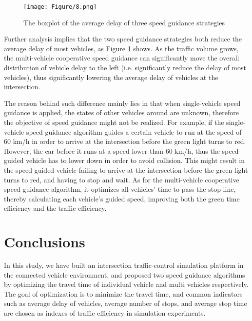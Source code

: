 \documentclass[10.5pt,compsoc]{TsT}
\theoremstyle{mystyle}
\begin{document}
{\begin{figure}
\centering
\texttt{[image: Figure/8.png]}
\caption{The boxplot of the average delay of three speed guidance
strategies}
\label{Figure 8} 
\end{figure}

Further analysis implies that the two speed guidance strategies both
reduce the average delay of most vehicles, as Figure \ref{Figure 8} shows. As the
traffic volume grows, the multi-vehicle cooperative speed guidance can
significantly move the overall distribution of vehicle delay to the left
(i.e. significantly reduce the delay of most vehicles), thus
significantly lowering the average delay of vehicles at the
intersection.

The reason behind such difference mainly lies in that when
single-vehicle speed guidance is applied, the states of other vehicles
around are unknown, therefore the objective of speed guidance might not
be realized. For example, if the single-vehicle speed guidance algorithm
guides a certain vehicle to run at the speed of 60 km/h in order to
arrive at the intersection before the green light turns to red. However,
the car before it runs at a speed lower than 60 km/h, thus the
speed-guided vehicle has to lower down in order to avoid collision. This
might result in the speed-guided vehicle failing to arrive at the
intersection before the green light turns to red, and having to stop and
wait. As for the multi-vehicle cooperative speed guidance algorithm, it
optimizes all vehicles' time to pass the stop-line, thereby calculating
each vehicle's guided speed, improving both the green time efficiency
and the traffic efficiency.

\section{Conclusions}
\noindent
In this study, we have built an intersection traffic-control simulation
platform in the connected vehicle environment, and proposed two speed
guidance algorithms by optimizing the travel time of individual vehicle
and multi vehicles respectively. The goal of optimization is to minimize
the travel time, and common indicators such as average delay of
vehicles, average number of stops, and average stop time are chosen as
indexes of traffic efficiency in simulation experiments.

}
\end{document}
